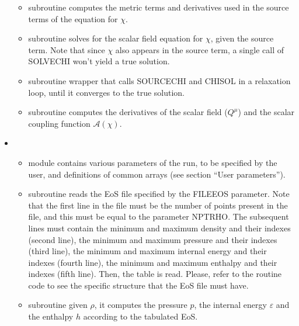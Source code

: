 \documentclass[letterpaper,10pt,english]{sphinxmanual}
\begin{document}
\begin{itemize}
\begin{itemize}
\item {} 
\sphinxAtStartPar
subroutine  \sphinxhyphen{} computes the metric terms and derivatives used in the source terms of the equation for \(\chi\).

\item {} 
\sphinxAtStartPar
subroutine  \sphinxhyphen{} solves for the scalar field equation for \(\chi\), given the source term. Note that since \(\chi\) also appears in the source term, a single call of SOLVECHI won’t yield a true solution.

\item {} 
\sphinxAtStartPar
subroutine  \sphinxhyphen{} wrapper that calls SOURCECHI and CHISOL in a relaxation loop, until it converges to the true solution.

\item {} 
\sphinxAtStartPar
subroutine  \sphinxhyphen{} computes the derivatives of the scalar field (\(Q^\mu\)) and the scalar coupling function \(\mathcal{A}(\chi)\).


\end{itemize}

\item {} 
\sphinxAtStartPar
{}
\begin{itemize}
\item {} 
\sphinxAtStartPar
module  \sphinxhyphen{} contains various parameters of the run, to be specified by the user, and definitions of common arrays (see section “User parameters”).

\item {} 
\sphinxAtStartPar
subroutine  \sphinxhyphen{} reads the EoS file specified by the FILEEOS parameter. Note that the first line in the file must be the number of points present in the file, and this must be equal to the parameter NPTRHO. The subsequent lines must contain the minimum and maximum density and their indexes (second line), the minimum and maximum pressure and their indexes (third line), the minimum and maximum internal energy and their indexes (fourth line), the minimum and maximum enthalpy and their indexes (fifth line). Then, the table is read. Please, refer to the routine code to see the specific structure that the EoS file must have.

\item {} 
\sphinxAtStartPar
subroutine  \sphinxhyphen{} given \(\rho\), it computes the pressure \(p\), the internal energy \(\varepsilon\) and the enthalpy \(h\) according to the tabulated EoS.


\end{itemize}
\end{itemize}
\end{document}

